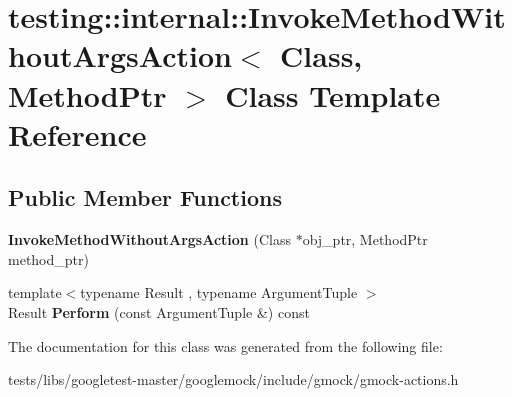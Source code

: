 \hypertarget{classtesting_1_1internal_1_1InvokeMethodWithoutArgsAction}{}\section{testing\+:\+:internal\+:\+:Invoke\+Method\+Without\+Args\+Action$<$ Class, Method\+Ptr $>$ Class Template Reference}
\label{classtesting_1_1internal_1_1InvokeMethodWithoutArgsAction}
\subsection*{Public Member Functions}
\begin{DoxyCompactItemize}
\item 
\mbox{\label{classtesting_1_1internal_1_1InvokeMethodWithoutArgsAction_ac4d655e386f47a96c7a6e1670b20e991}} 
{\bfseries Invoke\+Method\+Without\+Args\+Action} (Class $\ast$obj\+\_\+ptr, Method\+Ptr method\+\_\+ptr)
\item 
\mbox{\label{classtesting_1_1internal_1_1InvokeMethodWithoutArgsAction_a9915e4f7a064e00b7798216644670b52}} 
{\footnotesize template$<$typename Result , typename Argument\+Tuple $>$ }\\Result {\bfseries Perform} (const Argument\+Tuple \&) const
\end{DoxyCompactItemize}


The documentation for this class was generated from the following file\+:\begin{DoxyCompactItemize}
\item 
tests/libs/googletest-\/master/googlemock/include/gmock/gmock-\/actions.\+h\end{DoxyCompactItemize}
